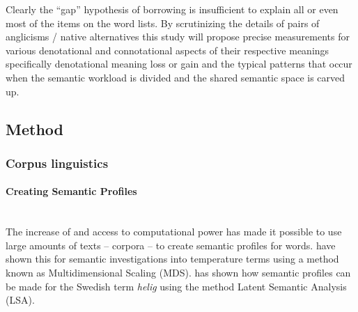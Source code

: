 \documentclass[a4paper]{article}
\begin{document}
Clearly the ``gap'' hypothesis of borrowing is insufficient to explain all or even most of the items on the word lists. By scrutinizing the details of pairs of anglicisms / native alternatives this study will propose precise measurements for various denotational and connotational aspects of their respective meanings specifically denotational meaning loss or gain and the typical patterns that occur when the semantic workload is divided and the shared semantic space is carved up.


\subsection{Method}


\subsubsection{Corpus linguistics}

\paragraph{Creating Semantic Profiles} 
\hspace{0pt} \\
The increase of and access to computational power has made it possible to use large amounts of texts -- corpora -- to create semantic profiles for words. \citet{Koptjevskaja-Tamm} have shown this for semantic investigations into temperature terms using a method known as Multidimensional Scaling (MDS). \citet{Sikstrom2012} has shown how semantic profiles can be made for the Swedish term \textit{helig} using the method Latent Semantic Analysis (LSA). 
\end{document}
